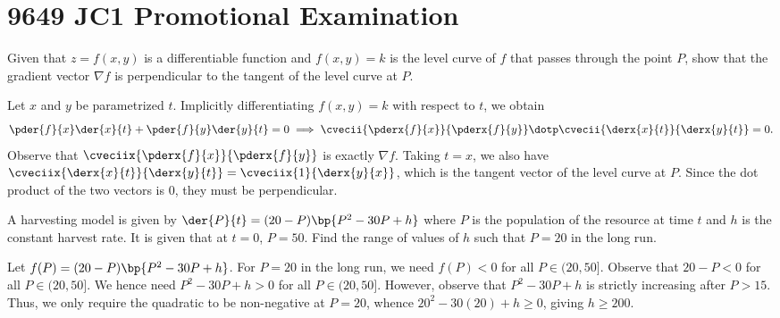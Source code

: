 \section{9649 JC1 Promotional Examination}

\begin{problem}
    Given that $z = f(x, y)$ is a differentiable function and $f(x, y) = k$ is the level curve of $f$ that passes through the point $P$, show that the gradient vector $\nabla f$ is perpendicular to the tangent of the level curve at $P$.
\end{problem}
\begin{solution}
    Let $x$ and $y$ be parametrized $t$. Implicitly differentiating $f(x, y) = k$ with respect to $t$, we obtain \[\pder{f}{x} \der{x}{t} + \pder{f}{y} \der{y}{t} = 0 \implies \cvecii{\pderx{f}{x}}{\pderx{f}{y}} \dotp \cvecii{\derx{x}{t}}{\derx{y}{t}} = 0.\] Observe that $\cveciix{\pderx{f}{x}}{\pderx{f}{y}}$ is exactly $\nabla f$. Taking $t = x$, we also have $\cveciix{\derx{x}{t}}{\derx{y}{t}} = \cveciix{1}{\derx{y}{x}}$, which is the tangent vector of the level curve at $P$. Since the dot product of the two vectors is 0, they must be perpendicular.
\end{solution}

\begin{problem}
    A harvesting model is given by $\der{P}{t} = (20-P)\bp{P^2 - 30 P + h}$ where $P$ is the population of the resource at time $t$ and $h$ is the constant harvest rate. It is given that at $t = 0$, $P = 50$. Find the range of values of $h$ such that $P=20$ in the long run.
\end{problem}
\begin{solution}
    Let $f(P) = (20-P)\bp{P^2 - 30 P + h}$. For $P = 20$ in the long run, we need $f(P) < 0$ for all $P \in (20, 50]$. Observe that $20 -P < 0$ for all $P \in (20, 50]$. We hence need $P^2 - 30 P + h > 0$ for all $P \in (20, 50]$. However, observe that $P^2 - 30P + h$ is strictly increasing after $P > 15$. Thus, we only require the quadratic to be non-negative at $P = 20$, whence $20^2 - 30(20) + h \geq 0$, giving $h \geq 200$.
\end{solution}

